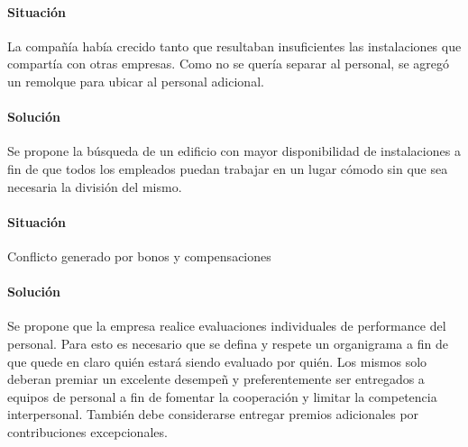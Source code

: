 \documentclass[12pt,a4paper,spanish]{article}
\begin{document}
\paragraph{Situaci\'on}
La compa\~{n}\'{i}a hab\'{i}a crecido tanto que resultaban insuficientes las instalaciones que compart\'{i}a con otras empresas. Como no se quer\'{i}a separar al personal, se agreg\'{o} un remolque para ubicar al personal adicional.
\paragraph{Soluci\'on}
Se propone la b\'{u}squeda de un edificio con mayor disponibilidad de instalaciones a fin de que todos los empleados puedan trabajar en un lugar c\'{o}modo sin que sea necesaria la divisi\'{o}n del mismo. 
\paragraph{Situaci\'on}
Conflicto generado por bonos y compensaciones
\paragraph{Soluci\'on}
Se propone que la empresa realice evaluaciones individuales de performance del personal. Para esto es necesario que se defina y respete un organigrama a fin de que quede en claro qui\'{e}n estar\'{a} siendo evaluado por qui\'{e}n. Los mismos solo deberan premiar un excelente desempe\~{n} y preferentemente ser entregados a equipos de personal a fin de fomentar la cooperaci\'{o}n y limitar la competencia interpersonal. Tambi\'{e}n debe considerarse entregar premios adicionales por contribuciones excepcionales.
\end{document}
